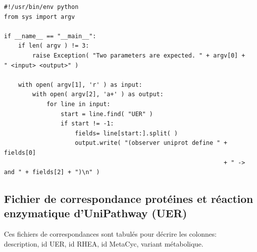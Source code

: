 \begin{lstlisting}[style=python-style,caption=mappingUER\_Metacyc.py]
#!/usr/bin/env python
from sys import argv

if __name__ == "__main__":
    if len( argv ) != 3:
        raise Exception( "Two parameters are expected. " + argv[0] +  " <input> <output>" )
    
    with open( argv[1], 'r' ) as input:
        with open( argv[2], 'a+' ) as output:
            for line in input:
                start = line.find( "UER" )
                if start != -1:
                    fields= line[start:].split( )
                    output.write( "(observer uniprot define " + fields[0]
                                                              + " -> and " + fields[2] + ")\n" )
\end{lstlisting}

\subsection{Fichier de correspondance protéines et réaction enzymatique d'UniPathway (UER)}

Ces fichiers de correspondances sont tabulés pour décrire les colonnes: description, id UER, id RHEA, id MetaCyc, variant métabolique.

